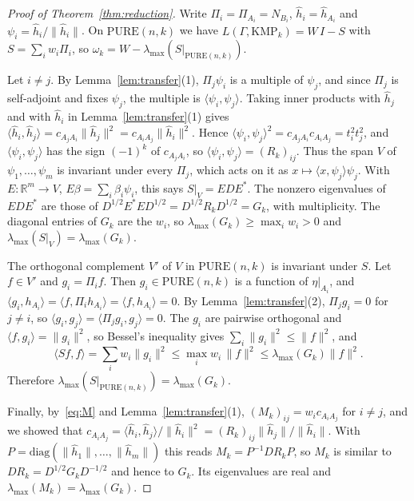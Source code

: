 \documentclass[11pt]{amsart}
\theoremstyle{remark}
\numberwithin{equation}{section}
\newcommand{\R}{\mathbb R}
\newcommand{\PURE}{\mathrm{PURE}}
\newcommand{\KMP}{\mathrm{KMP}}
\begin{document}
\begin{proof}[Proof of Theorem~\ref{thm:reduction}]
Write $\Pi_i=\Pi_{A_i}=N_{B_i}$, $\hat h_i=\hat h_{A_i}$ and $\psi_i=\hat h_i/\|\hat h_i\|$. On $\PURE(n,k)$ we have $L(\Gamma,\KMP_k)=W\,I-S$ with $S=\sum_iw_i\Pi_i$, so $\omega_k=W-\lambda_{\max}(S|_{\PURE(n,k)})$.

Let $i\ne j$. By Lemma~\ref{lem:transfer}(1), $\Pi_j\psi_i$ is a multiple of $\psi_j$, and since $\Pi_j$ is self-adjoint and fixes $\psi_j$, the multiple is $\langle \psi_i,\psi_j\rangle$. Taking inner products with $\hat h_j$ and with $\hat h_i$ in Lemma~\ref{lem:transfer}(1) gives $\langle\hat h_i,\hat h_j\rangle=c_{A_jA_i}\|\hat h_j\|^2=c_{A_iA_j}\|\hat h_i\|^2$. Hence $\langle \psi_i,\psi_j\rangle^2=c_{A_jA_i}c_{A_iA_j}=t_i^2t_j^2$, and $\langle \psi_i,\psi_j\rangle$ has the sign $(-1)^k$ of $c_{A_jA_i}$, so $\langle \psi_i,\psi_j\rangle=(R_k)_{ij}$. Thus the span $V$ of $\psi_1,\dots,\psi_m$ is invariant under every $\Pi_j$, which acts on it as $x\mapsto\langle x,\psi_j\rangle \psi_j$. With $E\colon\R^m\to V$, $E\beta=\sum_i\beta_i\psi_i$, this says $S|_V=EDE^*$. The nonzero eigenvalues of $EDE^*$ are those of $D^{1/2}E^*ED^{1/2}=D^{1/2}R_kD^{1/2}=G_k$, with multiplicity. The diagonal entries of $G_k$ are the $w_i$, so $\lambda_{\max}(G_k)\ge\max_iw_i>0$ and $\lambda_{\max}(S|_V)=\lambda_{\max}(G_k)$.

The orthogonal complement $V'$ of $V$ in $\PURE(n,k)$ is invariant under $S$. Let $f\in V'$ and $g_i=\Pi_if$. Then $g_i\in\PURE(n,k)$ is a function of $\eta|_{A_i}$, and $\langle g_i,h_{A_i}\rangle=\langle f,\Pi_ih_{A_i}\rangle=\langle f,h_{A_i}\rangle=0$. By Lemma~\ref{lem:transfer}(2), $\Pi_jg_i=0$ for $j\ne i$, so $\langle g_i,g_j\rangle=\langle\Pi_jg_i,g_j\rangle=0$. The $g_i$ are pairwise orthogonal and $\langle f,g_i\rangle=\|g_i\|^2$, so Bessel's inequality gives $\sum_i\|g_i\|^2\le\|f\|^2$, and
\[
\langle Sf,f\rangle=\sum_iw_i\|g_i\|^2\le\max_iw_i\,\|f\|^2\le\lambda_{\max}(G_k)\|f\|^2.
\]
Therefore $\lambda_{\max}(S|_{\PURE(n,k)})=\lambda_{\max}(G_k)$.

Finally, by~\eqref{eq:M} and Lemma~\ref{lem:transfer}(1), $(M_k)_{ij}=w_ic_{A_iA_j}$ for $i\ne j$, and we showed that $c_{A_iA_j}=\langle\hat h_i,\hat h_j\rangle/\|\hat h_i\|^2=(R_k)_{ij}\|\hat h_j\|/\|\hat h_i\|$. With $P=\mathrm{diag}(\|\hat h_1\|,\dots,\|\hat h_m\|)$ this reads $M_k=P^{-1}DR_kP$, so $M_k$ is similar to $DR_k=D^{1/2}G_kD^{-1/2}$ and hence to $G_k$. Its eigenvalues are real and $\lambda_{\max}(M_k)=\lambda_{\max}(G_k)$.
\end{proof}
\end{document}
